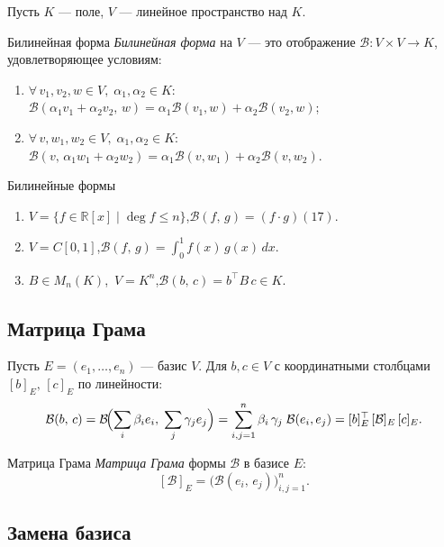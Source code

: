 Пусть $K$ — поле, $V$ — линейное пространство над $K$.

\begin{Definition}{Билинейная форма}{}
	\textit{Билинейная форма} на $V$ — это отображение $\mathcal{B} \colon V \times V \to K$, удовлетворяющее условиям:
	\begin{enumerate}
		\item $\forall\, v_1, v_2, w \in V,\; \alpha_1, \alpha_2 \in K$:\quad
		$\mathcal{B}(\alpha_1 v_1 + \alpha_2 v_2,\, w) = \alpha_1 \mathcal{B}(v_1, w) + \alpha_2 \mathcal{B}(v_2, w)$;
		\item $\forall\, v, w_1, w_2 \in V,\; \alpha_1, \alpha_2 \in K$:\quad
		$\mathcal{B}(v,\, \alpha_1 w_1 + \alpha_2 w_2) = \alpha_1 \mathcal{B}(v, w_1) + \alpha_2 \mathcal{B}(v, w_2)$.
	\end{enumerate}
\end{Definition}

\begin{Example}{Билинейные формы}{}
	\begin{enumerate}
		\item $V = \{f \in \mathbb{R}[x] \mid \deg f \leq n\}$,\quad $\mathcal{B}(f,\, g) = (f \cdot g)(17)$.
		\item $V = C[0,1]$,\quad $\mathcal{B}(f,\, g) = \displaystyle\int_0^1 f(x)\,g(x)\,dx$.
		\item $B \in M_n(K)$,\ $V = K^n$,\quad $\mathcal{B}(b,\, c) = b^{\top} B\, c \in K$.
	\end{enumerate}
\end{Example}

\subsection{Матрица Грама}

Пусть $E = (e_1, \ldots, e_n)$ — базис $V$.
Для $b, c \in V$ с координатными столбцами $[b]_E,\, [c]_E$ по линейности:
\[
\mathcal{B}(b,\,c)
= \mathcal{B}\!\Bigl(\sum_i \beta_i e_i,\; \sum_j \gamma_j e_j\Bigr)
= \sum_{i,j=1}^{n} \beta_i\,\gamma_j\;\mathcal{B}(e_i, e_j)
= [b]_E^{\top}\,[\mathcal{B}]_E\,[c]_E.
\]

\begin{Definition}{Матрица Грама}{}
	\textit{Матрица Грама} формы $\mathcal{B}$ в базисе $E$:
	\[
	[\mathcal{B}]_E = \bigl(\mathcal{B}(e_i,\, e_j)\bigr)_{i,j=1}^{n}.
	\]
\end{Definition}

\subsection{Замена базиса}


